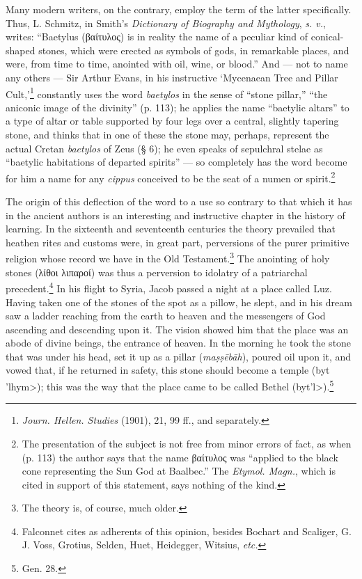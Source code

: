 \documentclass[a4paper, 12pt, oneside, polutonikogreek, english]{article}
\begin{document}
Many modern writers, on the contrary, employ the term of the latter specifically. Thus, L. Schmitz, in Smith's \emph{Dictionary of Biography and Mythology}, \emph{s. v.}, writes: ``Baetylus (βαίτυλος) is in reality the name of a peculiar kind of conical-shaped stones, which were erected as symbols of gods, in remarkable places, and were, from time to time, anointed with oil, wine, or blood.'' And --- not to name any others --- Sir Arthur Evans, in his instructive `Mycenaean Tree and Pillar Cult,'\footnote{\emph{Journ. Hellen. Studies} (1901), 21, 99 ff., and separately.} constantly uses the word \emph{baetylos} in the sense of ``stone pillar,'' ``the aniconic image of the divinity'' (p. 113); he applies the name ``baetylic altars'' to a type of altar or table supported by four legs over a central, slightly tapering stone, and thinks that in one of these the stone may, perhaps, represent the actual Cretan \emph{baetylos} of Zeus (§ 6); he even speaks of sepulchral stelae as ``baetylic habitations of departed spirits'' --- so completely has the word become for him a name for any \emph{cippus} conceived to be the seat of a numen or spirit.\footnote{The presentation of the subject is not free from minor errors of fact, as when (p. 113) the author says that the name βαίτυλος was ``applied to the black cone representing the Sun God at Baalbec.'' The \emph{Etymol. Magn.}, which is cited in support of this statement, says nothing of the kind.}

The origin of this deflection of the word to a use so contrary to that which it has in the ancient authors is an interesting and instructive chapter in the history of learning. In the sixteenth and seventeenth centuries the theory prevailed that heathen rites and customs were, in great part, perversions of the purer primitive religion whose record we have in the Old Testament.\footnote{The theory is, of course, much older.} The anointing of holy stones (λίθοι λιπαροί) was thus a perversion to idolatry of a patriarchal precedent.\footnote{Falconnet cites as adherents of this opinion, besides Bochart and Scaliger, G. J. Voss, Grotius, Selden, Huet, Heidegger, Witsius, \emph{etc.}} In his flight to Syria, Jacob passed a night at a place called Luz. Having taken one of the stones of the spot as a pillow, he slept, and in his dream saw a ladder reaching from the earth to heaven and the messengers of God ascending and descending upon it. The vision showed him that the place was an abode of divine beings, the entrance of heaven. In the morning he took the stone that was under his head, set it up as a pillar (\emph{maṣṣēbāh}), poured oil upon it, and vowed that, if he returned in safety, this stone should become a temple (\<byt 'lhym>); this was the way that the place came to be called Bethel (\<byt'l>).\footnote{Gen. 28.}
\end{document}
